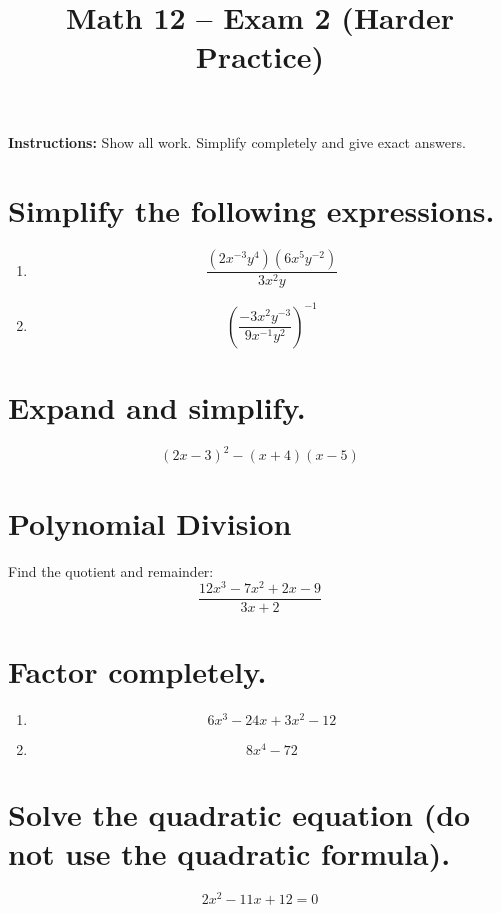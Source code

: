 \documentclass[12pt]{article}
\title{Math 12 -- Exam 2 (Harder Practice)}
\date{}
\begin{document}
\maketitle

\noindent \textbf{Instructions:} Show all work. Simplify completely and give exact answers.

\vspace{1em}

\section*{Simplify the following expressions.}

\begin{enumerate}
\item[(a)]
\[
\frac{(2x^{-3}y^4)(6x^5y^{-2})}{3x^2y}
\]

\item[(b)]
\[
\left(\frac{-3x^2y^{-3}}{9x^{-1}y^2}\right)^{-1}
\]
\end{enumerate}

\section*{Expand and simplify.}

\[
(2x-3)^2-(x+4)(x-5)
\]

\section*{Polynomial Division}

Find the quotient and remainder:
\[
\frac{12x^3-7x^2+2x-9}{3x+2}
\]

\section*{Factor completely.}

\begin{enumerate}
\item[(a)]
\[
6x^3-24x+3x^2-12
\]

\item[(b)]
\[
8x^4-72
\]
\end{enumerate}

\section*{Solve the quadratic equation (do not use the quadratic formula).}

\[
2x^2-11x+12=0
\]
\end{document}
